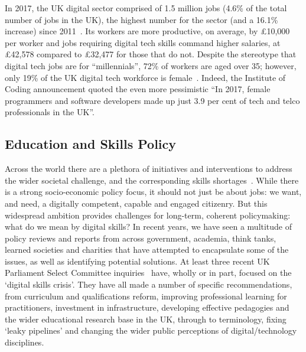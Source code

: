 \documentclass[sigconf,anonymous]{acmart}
\begin{document}

In 2017, the UK digital sector comprised of 1.5 million jobs (4.6\% of
the total number of jobs in the UK), the highest number for the sector
(and a 16.1\% increase) since 2011~\cite{dcms:2017}. Its workers are
more productive, on average, by \pounds10,000 per worker and jobs
requiring digital tech skills command higher salaries, at
\pounds42,578 compared to \pounds32,477 for those that do not. Despite
the stereotype that digital tech jobs are for ``millennials'', 72\% of
workers are aged over 35; however, only 19\% of the UK digital tech
workforce is female~\cite{technation:2018}. Indeed, the Institute of
Coding announcement \cite{DfE2018a} quoted the even more pessimistic
``In 2017, female programmers and software developers made up just 3.9
per cent of tech and telco professionals in the UK''.

\subsection{Education and Skills Policy}

Across the world there are a plethora of initiatives and interventions
to address the wider societal challenge, and the corresponding skills
shortages~\cite{cece:2017}. While there is a strong socio-economic
policy focus, it should not just be about jobs: we want, and need, a
digitally competent, capable and engaged citizenry. But this
widespread ambition provides challenges for long-term, coherent
policymaking: what do we mean by digital skills? In recent years, we
have seen a multitude of policy reviews and reports from across
government, academia, think tanks, learned societies and charities
that have attempted to encapsulate some of the issues, as well as
identifying potential solutions. At least three recent UK Parliament
Select Committee
inquiries~\cite{ukholds:2015,ukhocst:2016,ukholc:2017} have, wholly or
in part, focused on the `digital skills crisis'. They have all made a
number of specific recommendations, from curriculum and qualifications
reform, improving professional learning for practitioners, investment
in infrastructure, developing effective pedagogies and the wider
educational research base in the UK, through to terminology, fixing
`leaky pipelines' and changing the wider public perceptions of
digital/technology disciplines.
\end{document}
